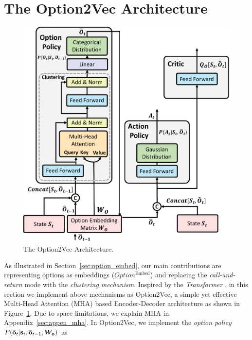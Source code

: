 \documentclass{article}
\begin{document}
\vspace{-3mm}
\section{The Option2Vec Architecture}
\label{sec:net_arch}
\begin{figure}
  \vspace{-5mm}
  \includegraphics[width=1\linewidth]{./figures/sa_attn_net.pdf}
  \vspace{-4mm}\caption{\label{fig:sa_net}\small The Option2Vec Architecture.}
\end{figure}
\vspace{-3mm}
As illustrated in Section~\ref{sec:option_embed}, our main
contributions are representing options as embeddings ($Option^{\textrm{Embed}}$) and
replacing the \emph{call-and-return} mode with the
\emph{clustering mechanism}. Inspired by the \emph{Transformer}
\cite{vaswani2017attention}, in this section we 
implement above mechanisms as Option2Vec, a simple yet
effective Multi-Head Attention (MHA) \cite{vaswani2017attention}
based Encoder-Decoder architecture as shown in Figure~\ref{fig:sa_net}. Due
to space limitations, we explain MHA in
Appendix~\ref{sec:appen_mha}.
In Option2Vec, we implement the \emph{option
  policy} $P(\bar{{\mathbf{o}}}_t|{\mathbf{s}}_t,\bar{{\mathbf{o}}}_{t-1};{\bm{W}}_{{\mathbf{o}}})$ as
\end{document}
